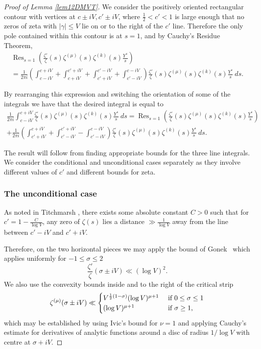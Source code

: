 \documentclass[12pt, a4paper,reqno]{amsart}
\DeclareMathOperator*{\res}{Res}
\theoremstyle{definition}
\numberwithin{equation}{section}
\begin{document}
\begin{proof}[Proof of Lemma \ref{lem12DMVT}]
We consider the positively oriented rectangular contour with vertices at $c\pm iV, c'\pm iV$, where $\frac{1}{2} < c'<1$ is large enough that no zeros of zeta with $|\gamma| \leq V$ lie on or to the right of the $c'$ line. Therefore the only pole contained within this contour is at $s=1$, and by Cauchy's Residue Theorem,
\begin{multline*}
    \res_{s=1}\left(\frac{\zeta'}{\zeta}(s)\zeta^{(\mu)}(s)\zeta^{(k)}(s)\frac{Y^s}{s}\right) \\
    =\frac{1}{2\pi i}\left(\int_{c-iV}^{c+iV}+\int_{c+iV}^{c'+iV}+\int_{c'+iV}^{c'-iV}+\int_{c'-iV}^{c-iV}\right)\frac{\zeta'}{\zeta}(s)\zeta^{(\mu)}(s)\zeta^{(k)}(s)\frac{Y^s}{s}\ ds.
\end{multline*}

By rearranging this expression and switching the orientation of some of the integrals we have that the desired integral  is equal to
\begin{multline*}
    \frac{1}{2\pi i}\int_{c-iV}^{c+iV}\frac{\zeta'}{\zeta}(s)\zeta^{(\mu)}(s)\zeta^{(k)}(s)\frac{Y^s}{s} \ ds = \res_{s=1}\left(\frac{\zeta'}{\zeta}(s)\zeta^{(\mu)}(s)\zeta^{(k)}(s)\frac{Y^s}{s}\right)
    \\+\frac{1}{2\pi i}\left(\int_{c'+iV}^{c+iV}+\int_{c'-iV}^{c'+iV}-\int_{c'-iV}^{c-iV}\right)\frac{\zeta'}{\zeta}(s)\zeta^{(\mu)}(s)\zeta^{(k)}(s)\frac{Y^s}{s} \ ds.
    \end{multline*}

The result will follow from finding appropriate bounds for the three line integrals. We consider the conditional and unconditional cases separately as they involve different values of $c'$ and different bounds for zeta. 


\subsubsection*{The unconditional case}\hfill

As noted in Titchmarsh \cite[p.54]{titchmarsh}, there exists some absolute constant $C>0$ such that for $c'=1-\frac{C}{\log V}$, any zero of $\zeta(s)$ lies a distance $\gg \frac{1}{\log V}$ away from the line between $c'-iV$ and $c'+iV$. 

Therefore, on the two horizontal pieces we may apply the bound of Gonek~\cite[\S 2]{Gonek1984} which applies uniformly for $-1 \leq \sigma \leq 2$
\[
\frac{\zeta'}{\zeta}(\sigma \pm iV) \ll (\log V)^2 .
\]
We also use the convexity bounds inside and to the right of the critical strip
\begin{equation} \label{eq:convexity}
\zeta^{(\mu)} (\sigma \pm iV) \ll
\begin{cases}
V^{\frac{1}{2}(1- \sigma)} (\log V)^{\mu+1} &\text{ if $ 0 \leq \sigma \leq 1$}\\
(\log V)^{\mu+1} &\text{ if $\sigma \geq 1$,}
\end{cases}
\end{equation}
which may be established by using Ivic's bound for $\nu=1$ \cite{ivic} and applying Cauchy's estimate for derivatives of analytic functions around a disc of radius $1/\log V$ with centre at $\sigma+iV$.



\end{proof}
\end{document}
